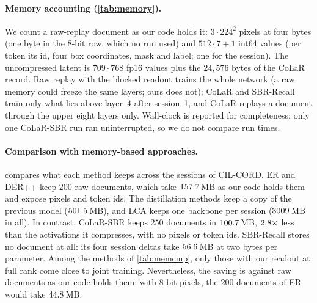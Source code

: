 \paragraph{Memory accounting (\cref{tab:memory}).} We count a raw-replay document as our code holds it: $3\cdot224^2$ pixels at four bytes (one byte in the 8-bit row, which no run used) and $512\cdot7{+}1$ int64 values (per token its id, four box coordinates, mask and label; one for the session). The uncompressed latent is $709\cdot768$ fp16 values plus the $24{,}576$ bytes of the CoLaR record. Raw replay with the blocked readout trains the whole network (a raw memory could freeze the same layers; ours does not); CoLaR and SBR-Recall train only what lies above layer~$4$ after session~1, and CoLaR replays a document through the upper eight layers only. Wall-clock is reported for completeness: only one CoLaR-SBR run ran uninterrupted, so we do not compare run times.

\begin{table}[t]
\centering\small
\setlength{\tabcolsep}{4pt}
\caption{\textbf{Memory comparison on CIL-CORD}: what each method keeps across sessions, its size, and the accuracy it reaches. $^{k}$Size computed from tensor shapes or parameter counts (fp32 as our code holds them, unless stated; SBR-Recall at two bytes per parameter); the other sizes were recorded by the runs. $^{l}$Not counted in the size. Marks on the accuracy cells as in \cref{tab:main}.}
\label{tab:memcmp}

\end{table}

\paragraph{Comparison with memory-based approaches.}  compares what each method keeps across the sessions of CIL-CORD. ER and DER++ keep $200$ raw documents, which take $157.7$\,MB as our code holds them and expose pixels and token ids. The distillation methods keep a copy of the previous model ($501.5$\,MB), and LCA keeps one backbone per session ($3009$\,MB in all). In contrast, CoLaR-SBR keeps $250$ documents in $100.7$\,MB, $2.8\times$ less than the activations it compresses, with no pixels or token ids. SBR-Recall stores no document at all: its four session deltas take $56.6$\,MB at two bytes per parameter. Among the methods of \cref{tab:memcmp}, only those with our readout at full rank come close to joint training. Nevertheless, the saving is against raw documents as our code holds them: with 8-bit pixels, the $200$ documents of ER would take $44.8$\,MB.

